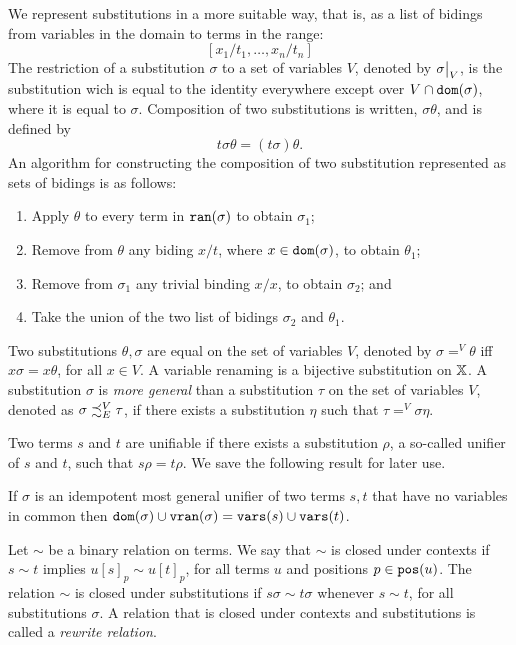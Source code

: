 We represent substitutions in a more suitable way, that is, as a list of bidings from variables in the domain to terms in the range:
$$[x_1 / t_1, \dots, x_n / t_n ]$$
The restriction of a substitution $\sigma$ to a set of variables $V$, denoted by $\restr{\sigma}{V}$, is the substitution wich is equal to the identity everywhere except over $V \cap \mathtt{dom}(\sigma)$, where it is equal to $\sigma$. Composition of two substitutions is written, $\sigma \theta$, and is defined by
$$t\sigma \theta = (t\sigma)\theta.$$
An algorithm for constructing the composition of two substitution represented as sets of bidings is as follows:
\begin{enumerate}
    \item Apply $\theta$ to every term in $\mathtt{ran}(\sigma)$ to obtain $\sigma_1$;
    \item Remove from $\theta$ any biding $x/t$, where $x \in \mathtt{dom}(\sigma)$, to obtain $\theta_1$;
    \item Remove from $\sigma_1$ any trivial binding $x/x$, to obtain $\sigma_2$; and
    \item Take the union of the two list of bidings $\sigma_2$ and $\theta_1$.
\end{enumerate}
Two substitutions $\theta, \sigma$ are equal on the set of variables $V$, denoted by $\sigma =^V \theta$ iff $x \sigma = x \theta$, for all $x \in V$. A variable renaming is a bijective substitution on $\mathbb{X}$. A substitution $\sigma$ is \textit{more general} than a substitution $\tau$ on the set of variables $V$, denoted as $\sigma \iqoless[E][V] \tau$, if there exists a substitution $\eta$ such that $ \tau =^V \sigma \eta$.


Two terms $s$ and $t$ are unifiable if there exists a substitution $\rho$, a so-called unifier of $s$ and $t$, such that $s \rho = t \rho$.
We save the following result for later use.

\begin{lemma}\label{lemma:unifiers-preserve-variables}
    If $\sigma$ is an idempotent most general unifier of two terms $s, t$ that have no variables in common then $\mathtt{dom}(\sigma) \cup \mathtt{v}\mathtt{ran}(\sigma) = \mathtt{vars}(s) \cup \mathtt{vars}(t)$.
\end{lemma}

Let $\sim$ be a binary relation on terms. We say that $\sim$ is closed under contexts if $s \sim t$ implies $u[s]_p \sim u[t]_p$, for all terms $u$ and positions $p \in \mathtt{pos}(u)$. The relation $\sim$ is closed under substitutions if $s\sigma \sim t\sigma$ whenever $s \sim t$, for all substitutions $\sigma$. A relation that is closed under contexts and substitutions is called a \textit{rewrite relation}.

